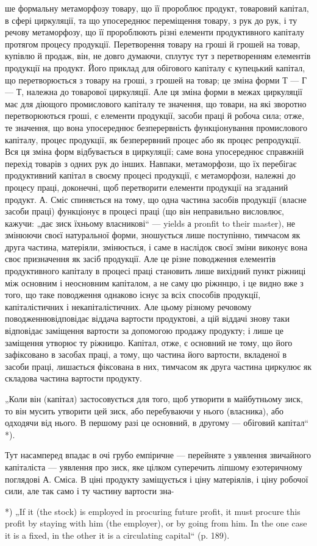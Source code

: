 ше формальну метаморфозу товару, що її пророблює продукт, товаровий
капітал, в сфері циркуляції, та що упосереднює переміщення товару,
з рук до рук, і ту речову метаморфозу, що її пророблюють різні елементи
продуктивного капіталу протягом процесу продукції. Перетворення
товару на гроші й грошей на товар, купівлю й продаж, він, не довго
думаючи, сплутує тут з перетворенням елементів продукції на продукт.
Його приклад для обігового капіталу є купецький капітал, що перетворюється
з товару на гроші, з грошей на товар; це зміна форми Т — Г — Т,
належна до товарової циркуляції. Але ця зміна форми в межах циркуляції
має для діющого промислового капіталу те значення, що товари, на
які зворотно перетворюються гроші, є елементи продукції, засоби праці
й робоча сила; отже, те значення, що вона упосереднює безперервність
функціонування промислового капіталу, процес продукції, як безперервний
процес або як процес репродукції. Вся ця зміна форм відбувається
в циркуляції; саме вона упосереднює справжній перехід товарів з
одних рук до інших. Навпаки, метаморфози, що їх перебігає продуктивний
капітал в своєму процесі продукції, є метаморфози, належні до
процесу праці, доконечні, щоб перетворити елементи продукції на
згаданий продукт. А. Сміс спиняється на тому, що одна частина засобів
продукції (власне засоби праці) функціонує в процесі праці (що він
неправильно висловлює, кажучи: „дає зиск їхньому власникові“ — yields а
pronfit to their master), не змінюючи своєї натуральної форми, зношується
лише поступінно, тимчасом як друга частина, матеріяли, змінюється, і
саме в наслідок своєї зміни виконує вона своє призначення як засіб продукції.
Але це різне поводження елементів продуктивного капіталу в
процесі праці становить лише вихідний пункт ріжниці між основним і неосновним
капіталом, а не саму цю ріжннцю, і це видно вже з того, що
таке поводження однаково існує за всіх способів продукції, капіталістичних
і некапіталістичних. Але цьому різному речовому поводженнювідповідає
віддача вартости продуктові, а цій віддачі знову таки відповідає
заміщення вартости за допомогою продажу продукту; і лише це
заміщення утворює ту ріжницю. Капітал, отже, є основний не тому, що
його зафіксовано в засобах праці, а тому, що частина його вартости,
вкладеної в засоби праці, лишається фіксована в них, тимчасом як друга
частина циркулює як складова частина вартости продукту.

„Коли він (капітал) застосовується для того, щоб утворити в майбутньому
зиск, то він мусить утворити цей зиск, або перебуваючи у
нього (власника), або одходячи від нього. В першому разі це основний,
в другому — обіговий капітал“ *).

Тут насамперед впадає в очі грубо емпіричне — перейняте з уявлення
звичайного капіталіста — уявлення про зиск, яке цілком суперечить ліпшому
езотеричному поглядові А. Сміса. В ціні продукту заміщується і ціну
матеріялів, і ціну робочої сили, але так само і ту частину вартости зна-

*) „If it (the stock) is employed in procuring future profit, it must procure this
profit by staying with him (the employer), or by going from him. In the one case
it is a fixed, in the other it is a circulating capital“ (p. 189).
